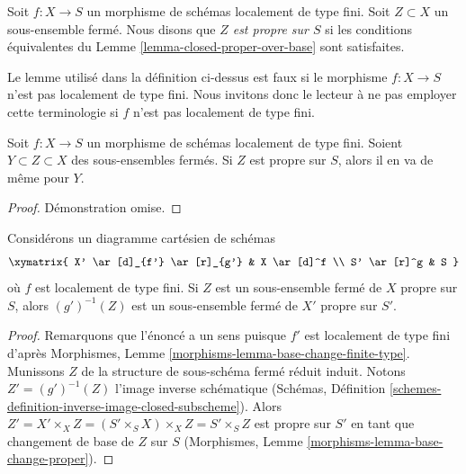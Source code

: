 \begin{definition}
\label{definition-proper-over-base}
Soit $f : X \to S$ un morphisme de schémas localement de type fini.
Soit $Z \subset X$ un sous-ensemble fermé.
Nous disons que {\it $Z$ est propre sur $S$}
si les conditions équivalentes du Lemme \ref{lemma-closed-proper-over-base}
sont satisfaites.
\end{definition}

\noindent
Le lemme utilisé dans la définition ci-dessus est faux si le morphisme
$f : X \to S$ n'est pas localement de type fini. Nous invitons donc
le lecteur à ne pas employer cette terminologie si $f$ n'est pas localement
de type fini.

\begin{lemma}
\label{lemma-closed-closed-proper-over-base}
Soit $f : X \to S$ un morphisme de schémas localement de type fini.
Soient $Y \subset Z \subset X$ des sous-ensembles fermés.
Si $Z$ est propre sur $S$, alors il en va de même pour $Y$.
\end{lemma}

\begin{proof}
Démonstration omise.
\end{proof}

\begin{lemma}
\label{lemma-base-change-closed-proper-over-base}
Considérons un diagramme cartésien de schémas
$$
\xymatrix{
X' \ar[d]_{f'} \ar[r]_{g'} & X \ar[d]^f \\
S' \ar[r]^g & S
}
$$
où $f$ est localement de type fini.
Si $Z$ est un sous-ensemble fermé de $X$ propre sur $S$, alors
$(g')^{-1}(Z)$ est un sous-ensemble fermé de $X'$ propre sur $S'$.
\end{lemma}

\begin{proof}
Remarquons que l'énoncé a un sens puisque $f'$ est localement de
type fini d'après Morphismes, Lemme \ref{morphisms-lemma-base-change-finite-type}.
Munissons $Z$ de la structure de sous-schéma fermé réduit induit.
Notons $Z' = (g')^{-1}(Z)$ l'image inverse schématique
(Schémas, Définition \ref{schemes-definition-inverse-image-closed-subscheme}).
Alors $Z' = X' \times_X Z = (S' \times_S X) \times_X Z = S' \times_S Z$
est propre sur $S'$ en tant que changement de base de $Z$ sur $S$
(Morphismes, Lemme \ref{morphisms-lemma-base-change-proper}).
\end{proof}

